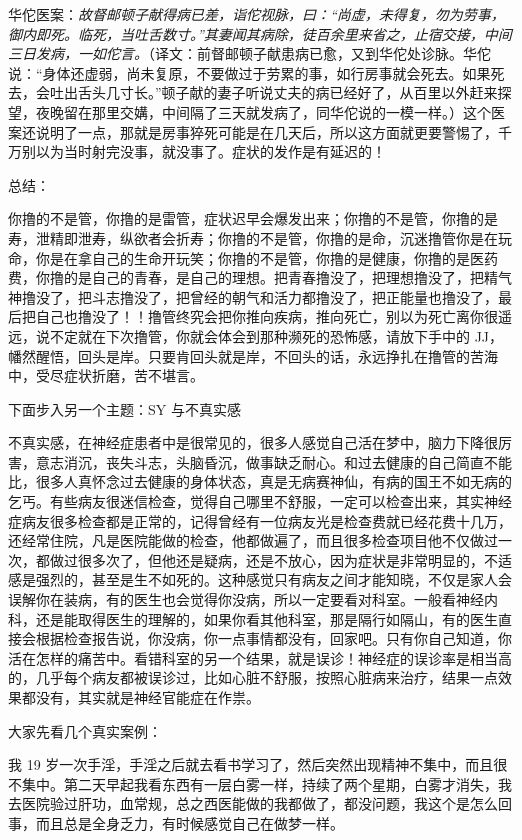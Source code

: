 华佗医案：{\it 故督邮顿子献得病已差，诣佗视脉，曰：“尚虚，未得复，勿为劳事，御内即死。临死，当吐舌数寸。”其妻闻其病除，徒百余里来省之，止宿交接，中间三日发病，一如佗言。}（译文：前督邮顿子献患病已愈，又到华佗处诊脉。华佗说：“身体还虚弱，尚未复原，不要做过于劳累的事，如行房事就会死去。如果死去，会吐出舌头几寸长。”顿子献的妻子听说丈夫的病已经好了，从百里以外赶来探望，夜晚留在那里交媾，中间隔了三天就发病了，同华佗说的一模一样。）这个医案还说明了一点，那就是房事猝死可能是在几天后，所以这方面就更要警惕了，千万别以为当时射完没事，就没事了。症状的发作是有延迟的！

总结：

你撸的不是管，你撸的是雷管，症状迟早会爆发出来；你撸的不是管，你撸的是寿，泄精即泄寿，纵欲者会折寿；你撸的不是管，你撸的是命，沉迷撸管你是在玩命，你是在拿自己的生命开玩笑；你撸的不是管，你撸的是健康，你撸的是医药费，你撸的是自己的青春，是自己的理想。把青春撸没了，把理想撸没了，把精气神撸没了，把斗志撸没了，把曾经的朝气和活力都撸没了，把正能量也撸没了，最后把自己也撸没了！！撸管终究会把你推向疾病，推向死亡，别以为死亡离你很遥远，说不定就在下次撸管，你就会体会到那种濒死的恐怖感，请放下手中的 JJ，幡然醒悟，回头是岸。只要肯回头就是岸，不回头的话，永远挣扎在撸管的苦海中，受尽症状折磨，苦不堪言。

下面步入另一个主题：SY 与不真实感

不真实感，在神经症患者中是很常见的，很多人感觉自己活在梦中，脑力下降很厉害，意志消沉，丧失斗志，头脑昏沉，做事缺乏耐心。和过去健康的自己简直不能比，很多人真怀念过去健康的身体状态，真是无病赛神仙，有病的国王不如无病的乞丐。有些病友很迷信检查，觉得自己哪里不舒服，一定可以检查出来，其实神经症病友很多检查都是正常的，记得曾经有一位病友光是检查费就已经花费十几万，还经常住院，凡是医院能做的检查，他都做遍了，而且很多检查项目他不仅做过一次，都做过很多次了，但他还是疑病，还是不放心，因为症状是非常明显的，不适感是强烈的，甚至是生不如死的。这种感觉只有病友之间才能知晓，不仅是家人会误解你在装病，有的医生也会觉得你没病，所以一定要看对科室。一般看神经内科，还是能取得医生的理解的，如果你看其他科室，那是隔行如隔山，有的医生直接会根据检查报告说，你没病，你一点事情都没有，回家吧。只有你自己知道，你活在怎样的痛苦中。看错科室的另一个结果，就是误诊！神经症的误诊率是相当高的，几乎每个病友都被误诊过，比如心脏不舒服，按照心脏病来治疗，结果一点效果都没有，其实就是神经官能症在作祟。

大家先看几个真实案例：

\begin{case}[不真实感]
    我 19 岁一次手淫，手淫之后就去看书学习了，然后突然出现精神不集中，而且很不集中。第二天早起我看东西有一层白雾一样，持续了两个星期，白雾才消失，我去医院验过肝功，血常规，总之西医能做的我都做了，都没问题，我这个是怎么回事，而且总是全身乏力，有时候感觉自己在做梦一样。
\end{case}

